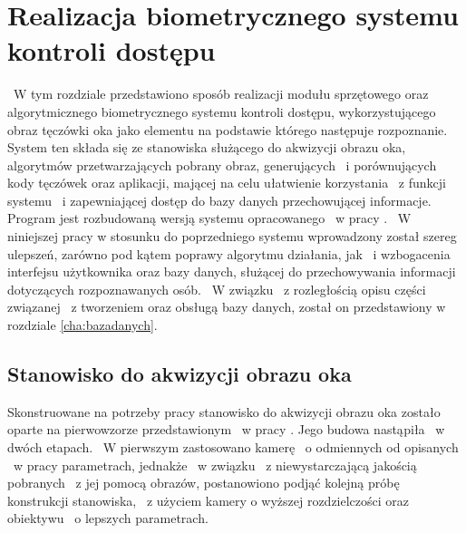 \chapter{Realizacja biometrycznego systemu kontroli dostępu}
\label{cha:realizacja}
~W tym rozdziale przedstawiono sposób realizacji modułu sprzętowego oraz algorytmicznego biometrycznego systemu kontroli dostępu, wykorzystującego obraz tęczówki oka jako elementu na podstawie którego następuje rozpoznanie. System ten składa się ze stanowiska służącego do akwizycji obrazu oka, algorytmów przetwarzających pobrany obraz, generujących ~i porównujących kody tęczówek oraz aplikacji, mającej na celu ułatwienie korzystania ~z funkcji systemu ~i zapewniającej dostęp do bazy danych przechowującej informacje. Program jest rozbudowaną wersją systemu opracowanego ~w pracy \cite{Gl11}. ~W niniejszej pracy w stosunku do poprzedniego systemu wprowadzony został szereg ulepszeń, zarówno pod kątem poprawy algorytmu działania, jak ~i wzbogacenia interfejsu użytkownika oraz bazy danych, służącej do przechowywania informacji dotyczących rozpoznawanych osób. ~W związku ~z rozległością opisu części związanej ~z tworzeniem oraz obsługą bazy danych, został on przedstawiony w rozdziale \ref{cha:bazadanych}.

\section{Stanowisko do akwizycji obrazu oka}
\label{sec:stanowisko}
Skonstruowane na potrzeby pracy stanowisko do akwizycji obrazu oka zostało oparte na pierwowzorze przedstawionym ~w pracy \cite{Gl11}. Jego budowa  nastąpiła ~w dwóch etapach. ~W pierwszym zastosowano kamerę ~o odmiennych od opisanych ~w pracy \cite{Gl11} parametrach, jednakże ~w związku ~z niewystarczającą jakością pobranych ~z jej pomocą obrazów, postanowiono podjąć kolejną próbę konstrukcji stanowiska, ~z użyciem kamery o wyższej rozdzielczości oraz obiektywu ~o lepszych parametrach.

